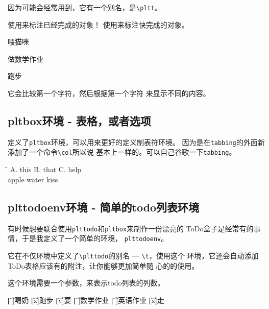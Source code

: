\documentclass{peterlitsdoc}
\newcommand{\vb}{\verb}
\begin{document}
因为可能会经常用到，它有一个别名，是\vb|\pltt|。

\begin{pltrun}
使用\plttodo[v]来标注已经完成的对象！
使用\plttodo[x]来标注快完成的对象。

\plttodo[v]喂猫咪

\plttodo[x]做数学作业

\plttodo[ ]跑步

它会比较第一个字符，然后根据第一个字符
来显示不同的内容。

\pltt[]   \pltt[x]  \pltt[  ] \pltt[ ]
\pltt[aa] \pltt[ a] \pltt[v]  \pltt[vv]
\pltt[ v]
\end{pltrun}



\subsection{pltbox环境 - 表格，或者选项}

定义了\vb|pltbox|环境，可以用来更好的定义制表符环境。
因为是在\vb|tabbing|的外面新添加了一个命令\vb|\col|所以说
基本上一样的。可以自己谷歌一下\vb|tabbing|。

\begin{pltrun}
\begin{pltbox}
\=\=\kill
A. this   \>B. that   \>C. help   \\
\plttodo[ ]apple                  \>
\plttodo[x]water                  \>
\plttodo[ ]kiss                   \\
\end{pltbox}
\end{pltrun}



\subsection{plttodoenv环境 - 简单的todo列表环境}

有时候想要联合使用\vb|plttodo|和\vb|pltbox|来制作一份漂亮的
ToDo盒子是经常有的事情，于是我定义了一个简单的环境，
\vb|plttodoenv|。

它在不仅环境中定义了\vb|\plttodo|的别名 --- \vb|\t|，使用这个
环境，它还会自动添加ToDo表格应该有的附注，让你能够更加简单随
心的的使用。

这个环境需要一个参数，来表示todo列表的列数。

\begin{pltrun}
\begin{plttodoenv}{2}
\t[ ]喝奶     \t[x]跑步     \t[v]耍
\t[ ]数学作业 \t[ ]英语作业 \t[x]走
\end{plttodoenv}
\end{pltrun}
\end{document}
